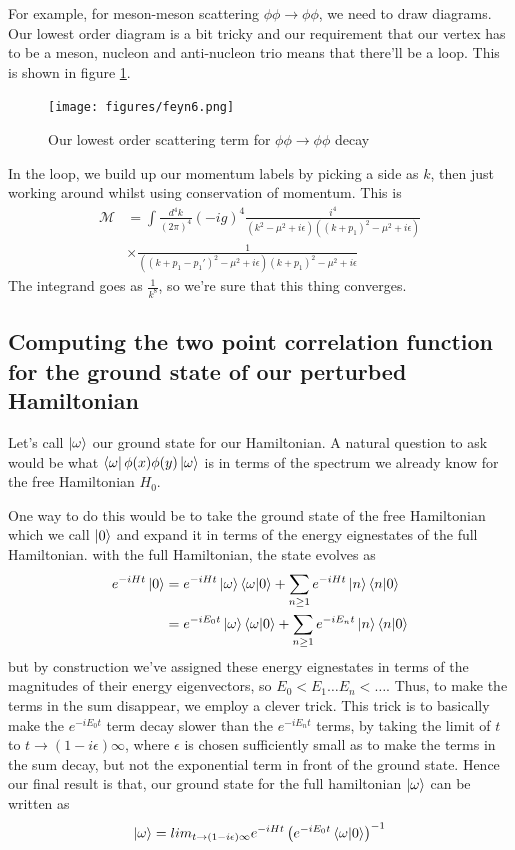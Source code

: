 \documentclass[11pt, oneside]{article}   	%
\theoremstyle{newline}
\theoremstyle{newline}
\theoremstyle{newline}
\theoremstyle{newline}
\theoremstyle{newline}
\begin{document}
For example, for meson-meson scattering $ \phi \phi \to \phi \phi $, 
we need to draw diagrams. Our lowest order diagram is 
a bit tricky and our requirement that our vertex has to be a 
meson, nucleon and anti-nucleon trio 
means that there'll be a loop. This is shown in figure \ref{fig:mesonLoop}. 

\begin{figure}[htpb]
\centering
\texttt{[image: figures/feyn6.png]}
\caption{Our lowest order scattering term for $ \phi \phi \to \phi \phi $ decay}%
\label{fig:mesonLoop}
\end{figure}
In the loop, we build up our momentum labels by picking a side as $ k$, 
then just working around whilst using conservation 
of momentum.
This is
\begin{align*} 
\mathcal{ M }  &= \int \frac{ d^ 4 k  }{ ( 2 \pi ) ^ 4  }( - i g ) ^ 4 \frac{i ^ 4 }{ ( k ^ 2 - \mu ^ 2 + i \epsilon ) ( ( k + p_1 ) ^ 2  - \mu ^ 2 + i \epsilon )} \\
	       & \times \frac{1}{( ( k + p_1  - p_1' ) ^ 2 - \mu ^  2+ i \epsilon ) ( k + p_1 ) ^ 2 - \mu ^ 2 + i \epsilon  }
\end{align*} The integrand goes as $ \frac{1}{ k ^ 8 } $, so 
we're sure that this thing converges. 

\pagebreak
\subsection{ Computing the two point correlation function for the ground state of our perturbed Hamiltonian } 
Let's call $\ket {\omega } $ our ground state for our Hamiltonian. A natural question to ask would be what $\bra {\omega } \phi(x) \phi( y ) \ket{\omega} $ is in terms of the spectrum we already know for the free Hamiltonian $H_0$.

One way to do this would be to take the ground state of the free Hamiltonian which we call $\ket{ 0 } $ and expand it in terms of the energy eignestates of the full Hamiltonian. with the full Hamiltonian, the state evolves as \begin{align*} e^{- iHt}\ket{0} &= e^{ - iHt } \ket{\omega}\bra{ \omega }\ket{0} + \sum_{ n \geq 1 }  e^ { -iHt } \ket{n}\bra{n}\ket{ 0 } \\
&= e^ { - iE_0 t } \ket{ \omega }\bra{\omega}\ket{0} + \sum_{n \geq 1} e^{ - i E_n t }\ket{n}\bra{n}\ket{0}   \end{align*}
but by construction we've assigned these energy eignestates in terms of the magnitudes of their energy eigenvectors, so $E_0 < E_1 \dots E_n < \dots $. Thus, to make the terms in the sum disappear, we employ a clever trick. This trick is to basically make the $e^{ - i E_0 t} $ term decay slower than the $e^ { - iE_n t} $ terms, by taking the limit of $t$ to $t \rightarrow (1 - i\epsilon )\infty$, where $\epsilon$ is chosen sufficiently small as to make the terms in the sum decay, but not the exponential term in front of the ground state. Hence our final result is that, our ground state for the full hamiltonian $\ket{\omega} $ can be written as \[ \ket{ \omega} = lim_{t \rightarrow (1  -i \epsilon)\infty  }e^{ - i Ht } \left( e^{ - i E_0 t}\bra{\omega}\ket{0} \right)^{- 1} \]
\end{document}
